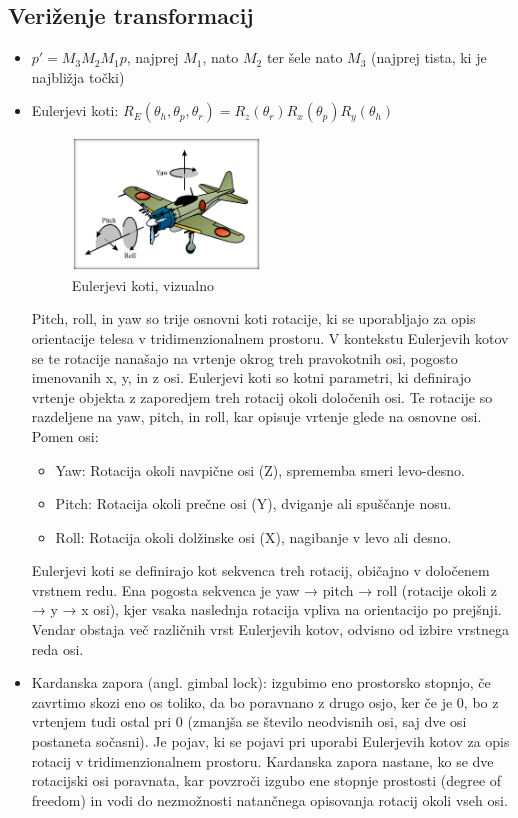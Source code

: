\documentclass{article}
\begin{document}
\subsection{Veriženje transformacij}
\begin{itemize}
    \item $p' = M_3M_2M_1p$, najprej $M_1$, nato $M_2$ ter šele nato $M_3$ (najprej tista, ki je najbližja točki)
    \item Eulerjevi koti: $R_E(\theta_h, \theta_p, \theta_r) = R_z(\theta_r)R_x(\theta_p)R_y(\theta_h)$
    \begin{figure}[H]
    \centering
    \includegraphics[width=50mm]{src/eulerjevi_koti.png}
    \caption{Eulerjevi koti, vizualno}
    \end{figure}
    Pitch, roll, in yaw so trije osnovni koti rotacije, ki se uporabljajo za opis orientacije telesa v tridimenzionalnem prostoru. V kontekstu Eulerjevih kotov se te rotacije nanašajo na vrtenje okrog treh pravokotnih osi, pogosto imenovanih x, y, in z osi. Eulerjevi koti so kotni parametri, ki definirajo vrtenje objekta z zaporedjem treh rotacij okoli določenih osi. Te rotacije so razdeljene na yaw, pitch, in roll, kar opisuje vrtenje glede na osnovne osi. Pomen osi:
    \begin{itemize}
        \item Yaw: Rotacija okoli navpične osi (Z), sprememba smeri levo-desno.
        \item Pitch: Rotacija okoli prečne osi (Y), dviganje ali spuščanje nosu.
        \item Roll: Rotacija okoli dolžinske osi (X), nagibanje v levo ali desno.
    \end{itemize}
    Eulerjevi koti se definirajo kot sekvenca treh rotacij, običajno v določenem vrstnem redu. Ena pogosta sekvenca je yaw → pitch → roll (rotacije okoli z → y → x osi), kjer vsaka naslednja rotacija vpliva na orientacijo po prejšnji. Vendar obstaja več različnih vrst Eulerjevih kotov, odvisno od izbire vrstnega reda osi.
    \item Kardanska zapora (angl. gimbal lock): izgubimo eno prostorsko stopnjo, če zavrtimo skozi eno os toliko, da bo poravnano z drugo osjo, ker če je 0, bo z vrtenjem tudi ostal pri 0 (zmanjša se število neodvisnih osi, saj dve osi postaneta sočasni). Je pojav, ki se pojavi pri uporabi Eulerjevih kotov za opis rotacij v tridimenzionalnem prostoru. Kardanska zapora nastane, ko se dve rotacijski osi poravnata, kar povzroči izgubo ene stopnje prostosti (degree of freedom) in vodi do nezmožnosti natančnega opisovanja rotacij okoli vseh osi.

\end{itemize}
\end{document}
